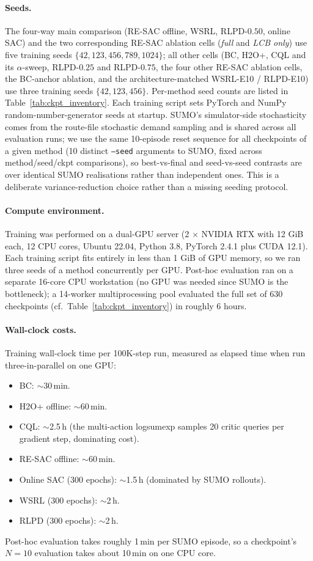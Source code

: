 \documentclass[journal,10pt]{IEEEtran}
\begin{document}
\paragraph{Seeds.} The four-way main comparison (RE-SAC offline, WSRL, RLPD-$0.50$, online SAC) and the two corresponding RE-SAC ablation cells (\emph{full} and \emph{LCB only}) use five training seeds $\{42, 123, 456, 789, 1024\}$; all other cells (BC, H2O+, CQL and its $\alpha$-sweep, RLPD-$0.25$ and RLPD-$0.75$, the four other RE-SAC ablation cells, the BC-anchor ablation, and the architecture-matched WSRL-E10 / RLPD-E10) use three training seeds $\{42, 123, 456\}$. Per-method seed counts are listed in Table~\ref{tab:ckpt_inventory}. Each training script sets PyTorch and NumPy random-number-generator seeds at startup. SUMO's simulator-side stochasticity comes from the route-file stochastic demand sampling and is shared across all evaluation runs; we use the same 10-episode reset sequence for all checkpoints of a given method (10 distinct \texttt{--seed} arguments to SUMO, fixed across method/seed/ckpt comparisons), so best-vs-final and seed-vs-seed contrasts are over identical SUMO realisations rather than independent ones. This is a deliberate variance-reduction choice rather than a missing seeding protocol.

\paragraph{Compute environment.} Training was performed on a dual-GPU server (2 $\times$ NVIDIA RTX with 12 GiB each, 12 CPU cores, Ubuntu 22.04, Python 3.8, PyTorch 2.4.1 plus CUDA 12.1). Each training script fits entirely in less than 1 GiB of GPU memory, so we ran three seeds of a method concurrently per GPU. Post-hoc evaluation ran on a separate 16-core CPU workstation (no GPU was needed since SUMO is the bottleneck); a 14-worker multiprocessing pool evaluated the full set of 630 checkpoints (cf.\ Table~\ref{tab:ckpt_inventory}) in roughly 6 hours.

\paragraph{Wall-clock costs.} Training wall-clock time per 100K-step run, measured as elapsed time when run three-in-parallel on one GPU:
\begin{itemize}
\itemsep0em
\item BC: $\sim$30\,min.
\item H2O+ offline: $\sim$60\,min.
\item CQL: $\sim$2.5\,h (the multi-action logsumexp samples 20 critic queries per gradient step, dominating cost).
\item RE-SAC offline: $\sim$60\,min.
\item Online SAC (300 epochs): $\sim$1.5\,h (dominated by SUMO rollouts).
\item WSRL (300 epochs): $\sim$2\,h.
\item RLPD (300 epochs): $\sim$2\,h.
\end{itemize}
Post-hoc evaluation takes roughly 1\,min per SUMO episode, so a checkpoint's $N=10$ evaluation takes about 10\,min on one CPU core.
\end{document}
